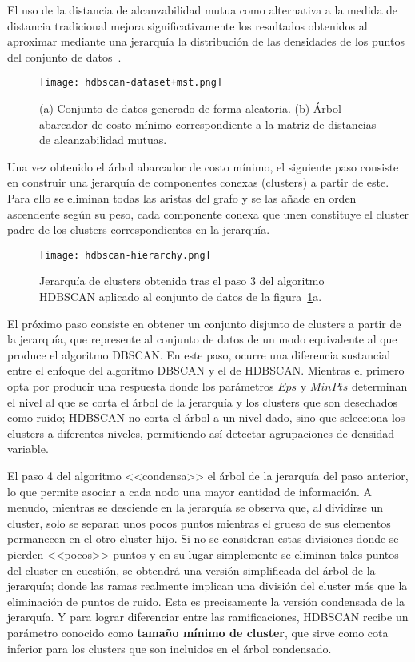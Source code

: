 El uso de la distancia de alcanzabilidad mutua como alternativa a la medida de distancia tradicional mejora significativamente los resultados obtenidos al aproximar mediante una jerarquía la distribución de las densidades de los puntos del conjunto de datos~\cite{Eldridge15}.

\begin{figure}[!h]
    \centering
    \texttt{[image: hdbscan-dataset+mst.png]}
    \caption{(a) Conjunto de datos generado de forma aleatoria. (b) Árbol abarcador de costo mínimo correspondiente a la matriz de distancias de alcanzabilidad mutuas.}
    \label{img:hdbscan-dataset+mst}
\end{figure}

Una vez obtenido el árbol abarcador de costo mínimo, el siguiente paso consiste en construir una jerarquía de componentes conexas (clusters) a partir de este.
Para ello se eliminan todas las aristas del grafo y se las añade en orden ascendente según su peso, cada componente conexa que unen constituye el cluster padre de los clusters correspondientes en la jerarquía.

\begin{figure}[!h]
    \centering
    \texttt{[image: hdbscan-hierarchy.png]}
    \caption{Jerarquía de clusters obtenida tras el paso 3 del algoritmo HDBSCAN aplicado al conjunto de datos de la figura~\ref{img:hdbscan-dataset+mst}a.}
    \label{img:hdbscan-hierarchy}
\end{figure}

El próximo paso consiste en obtener un conjunto disjunto de clusters a partir de la jerarquía, que represente al conjunto de datos de un modo equivalente al que produce el algoritmo DBSCAN\@.
En este paso, ocurre una diferencia sustancial entre el enfoque del algoritmo DBSCAN y el de HDBSCAN\@.
Mientras el primero opta por producir una respuesta donde los parámetros $Eps$ y $MinPts$ determinan el nivel al que se corta el árbol de la jerarquía y los clusters que son desechados como ruido;
HDBSCAN no corta el árbol a un nivel dado, sino que selecciona los clusters a diferentes niveles, permitiendo así detectar agrupaciones de densidad variable.

El paso 4 del algoritmo <<condensa>> el árbol de la jerarquía del paso anterior, lo que permite asociar a cada nodo una mayor cantidad de información.
A menudo, mientras se desciende en la jerarquía se observa que, al dividirse un cluster, solo se separan unos pocos puntos mientras el grueso de sus elementos permanecen en el otro cluster hijo.
Si no se consideran estas divisiones donde se pierden <<pocos>> puntos y en su lugar simplemente se eliminan tales puntos del cluster en cuestión, se obtendrá una versión simplificada del árbol de la jerarquía;
donde las ramas realmente implican una división del cluster más que la eliminación de puntos de ruido.
Esta es precisamente la versión condensada de la jerarquía.
Y para lograr diferenciar entre las ramificaciones, HDBSCAN recibe un parámetro conocido como \textbf{tamaño mínimo de cluster}, que sirve como cota inferior para los clusters que son incluidos en el árbol condensado.

